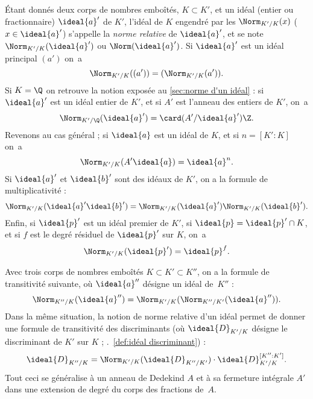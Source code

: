 \documentclass[11pt, %
  title in boldface,
  theorem in new line,
  theorem numbering = section,
  number theorems separately,
  simple name,
]{beaulivre}
\begin{document}
    Étant donnés deux corps de nombres emboîtés, \( K \subset K' \), et un idéal (entier ou fractionnaire) \( \ideal{a}' \) de \( K' \), l'idéal de \( K \) engendré par les \( \Norm_{K'/K}(x) \) (\( x \in \ideal{a}' \)) s'appelle la \emph{norme relative} de \( \ideal{a}' \), et se note \( \Norm_{K'/K}(\ideal{a}') \) ou \( \Norm(\ideal{a}') \). Si \( \ideal{a}' \) est un idéal principal \( (a') \) on~a
    \begin{equation}
        \Norm_{K'/K}((a')) = (\Norm_{K'/K}(a')).
    \end{equation}
    Si \( K = \Q \) on retrouve la notion exposée au \cref{sec:norme d'un idéal} : si \( \ideal{a}' \) est un idéal entier de \( K' \), et si \( A' \) est l'anneau des entiers de \( K' \), on~a
    \begin{equation}
        \Norm_{K'/\Q}(\ideal{a}') = \card(A'/\ideal{a}') \Z.
    \end{equation}
    Revenons au cas général ; si \( \ideal{a} \) est un idéal de \( K \), et si \( n = [K':K] \) on~a
    \begin{equation}
        \Norm_{K'/K}(A'\ideal{a}) = \ideal{a}^n.
    \end{equation}
    Si \( \ideal{a}' \) et \( \ideal{b}' \) sont des idéaux de \( K' \), on a la formule de multiplicativité :
    \begin{equation}
        \Norm_{K'/K}(\ideal{a}'\ideal{b}') = \Norm_{K'/K}(\ideal{a}') \Norm_{K'/K}(\ideal{b}').
    \end{equation}
    Enfin, si \( \ideal{p}' \) est un idéal premier de \( K' \), si \( \ideal{p} = \ideal{p}' \cap K \), et si \( f \) est le degré résiduel de \( \ideal{p}' \) sur \( K \), on~a
    \begin{equation}
        \Norm_{K'/K}(\ideal{p}') = \ideal{p}^f.
    \end{equation}

    Avec trois corps de nombres emboîtés \( K \subset K' \subset K'' \), on a la formule de transitivité suivante, où \( \ideal{a}'' \) désigne un idéal de~\( K'' \) :
    \begin{equation}
        \Norm_{K''/K}(\ideal{a}'') = \Norm_{K'/K}(\Norm_{K''/K'}(\ideal{a}'')).
    \end{equation}
    Dans la même situation, la notion de norme relative d'un idéal permet de donner une formule de transitivité des discriminants (où \( \ideal{D}_{K'/K} \) désigne le discriminant de \( K' \) sur \( K \) ; \cf.~\cref{def:idéal discriminant}) :
    \begin{equation}
        \ideal{D}_{K''/K} = \Norm_{K'/K}(\ideal{D}_{K''/K'}) \cdot \ideal{D}_{K'/K}^{[K'':K']}.
    \end{equation}
    Tout ceci se généralise à un anneau de Dedekind \( A \) et à sa fermeture intégrale \( A' \) dans une extension de degré du corps des fractions de~\( A \).
\end{document}
